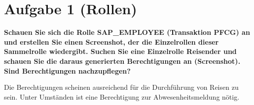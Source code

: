 \section{Aufgabe 1 (Rollen)}
\textbf{Schauen Sie sich die Rolle \glqq{}SAP\_EMPLOYEE\grqq{} (Transaktion
PFCG) an und erstellen Sie einen Screenshot, der die Einzelrollen dieser Sammelrolle wiedergibt. Suchen Sie eine
Einzelrolle \glqq{}Reisender\grqq{} und schauen Sie die daraus generierten
Berechtigungen an (Screenshot). Sind Berechtigungen nachzupflegen? }

\begin{center}
\end{center}

\begin{center}
\end{center}

\begin{center}
\end{center}

Die Berechtigungen scheinen ausreichend für die Durchführung von Reisen zu sein.
Unter Umständen ist eine Berechtigung zur Abwesenheitsmeldung nötig.

\clearpage